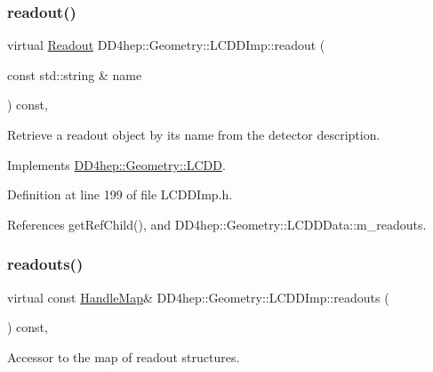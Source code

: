 \subsubsection{\texorpdfstring{readout()}{readout()}}
{\footnotesize\ttfamily virtual \hyperlink{class_d_d4hep_1_1_geometry_1_1_readout}{Readout} D\+D4hep\+::\+Geometry\+::\+L\+C\+D\+D\+Imp\+::readout (\begin{DoxyParamCaption}\item[{const std\+::string \&}]{name }\end{DoxyParamCaption}) const\hspace{0.3cm}{\ttfamily [inline]}, {\ttfamily [virtual]}}



Retrieve a readout object by it\textquotesingle{}s name from the detector description. 



Implements \hyperlink{class_d_d4hep_1_1_geometry_1_1_l_c_d_d_aa29f75fba9942edd7f73226a11c9598e}{D\+D4hep\+::\+Geometry\+::\+L\+C\+DD}.



Definition at line 199 of file L\+C\+D\+D\+Imp.\+h.



References get\+Ref\+Child(), and D\+D4hep\+::\+Geometry\+::\+L\+C\+D\+D\+Data\+::m\+\_\+readouts.

\hypertarget{class_d_d4hep_1_1_geometry_1_1_l_c_d_d_imp_a5967ac2419cccd4b5ab3e9f210dca2ab}{}\label{class_d_d4hep_1_1_geometry_1_1_l_c_d_d_imp_a5967ac2419cccd4b5ab3e9f210dca2ab} 
\subsubsection{\texorpdfstring{readouts()}{readouts()}}
{\footnotesize\ttfamily virtual const \hyperlink{class_d_d4hep_1_1_geometry_1_1_l_c_d_d_a05cb11e7355772c7b0794bcca59bf477}{Handle\+Map}\& D\+D4hep\+::\+Geometry\+::\+L\+C\+D\+D\+Imp\+::readouts (\begin{DoxyParamCaption}{ }\end{DoxyParamCaption}) const\hspace{0.3cm}{\ttfamily [inline]}, {\ttfamily [virtual]}}



Accessor to the map of readout structures. 



